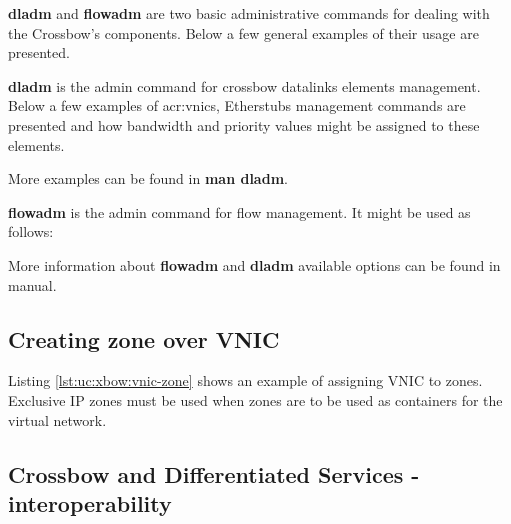 \documentclass[11pt]{book}
\begin{document}
        \textbf{dladm} and \textbf{flowadm} are two basic administrative commands for dealing with the Crossbow's
        components. Below a few general examples of their usage are presented.
  
        \textbf{dladm} is the admin command for crossbow datalinks elements management. Below a few examples of
        \gls{acr:vnic}s, Etherstubs management commands are presented and how bandwidth and priority values might be
        assigned to these elements.

        \noindent
        \begin{minipage}{\textwidth}
          
        \end{minipage}
  
        More examples can be found in \textbf{man dladm}.

        \medskip

        \textbf{flowadm} is the admin command for flow management. It might be used as follows:     

	\medskip

        \noindent
        \begin{minipage}{\textwidth}
          
        \end{minipage}

        More information about \textbf{flowadm} and \textbf{dladm} available options can be found in manual.

      \subsection{Creating zone over VNIC}

	Listing \ref{lst:uc:xbow:vnic-zone} shows an example of assigning VNIC to zones. Exclusive IP zones must be 
	used when zones are to be used as containers for the virtual network. 

	\medskip

       \noindent
        \begin{minipage}{\textwidth}
          
        \end{minipage}


      \subsection{Crossbow and Differentiated Services - interoperability}
      \label{sub:sol:diffserv}
\end{document}

